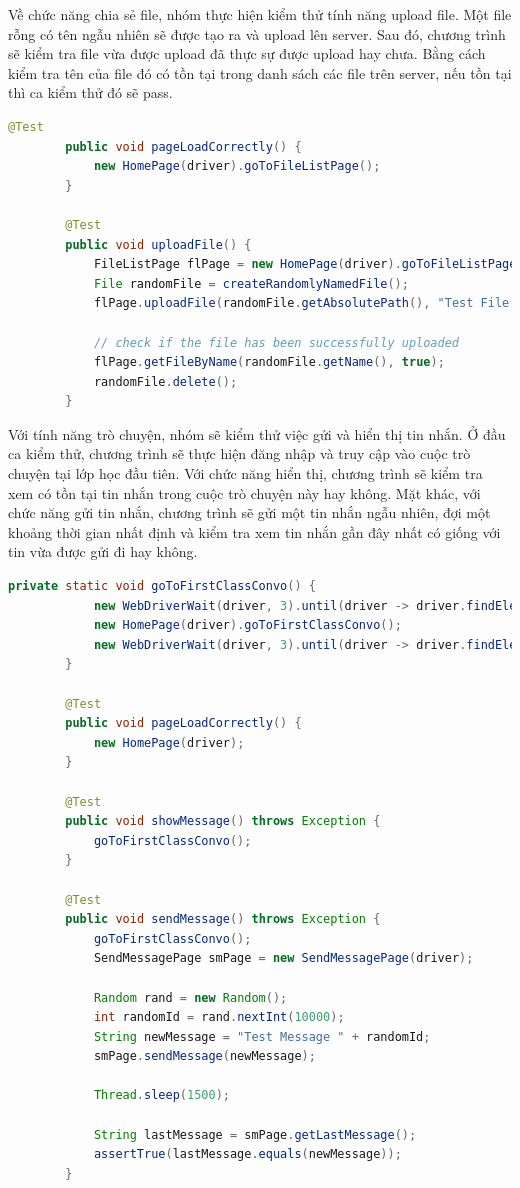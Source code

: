 \documentclass[./../main_file.tex]{subfiles}
\begin{document}
	Về chức năng chia sẻ file, nhóm thực hiện kiểm thử tính năng upload file. Một file rỗng có tên ngẫu nhiên sẽ được tạo ra và upload lên server. Sau đó, chương trình sẽ kiểm tra file vừa được upload đã thực sự được upload hay chưa. Bằng cách kiểm tra tên của file đó có tồn tại trong danh sách các file trên server, nếu tồn tại thì ca kiểm thử đó sẽ pass.
	
	\begin{lstlisting}[language=Java,caption=Ca kiểm thử gửi file]
		@Test
		public void pageLoadCorrectly() {
			new HomePage(driver).goToFileListPage();
		}
		
		@Test
		public void uploadFile() {
			FileListPage flPage = new HomePage(driver).goToFileListPage();
			File randomFile = createRandomlyNamedFile();
			flPage.uploadFile(randomFile.getAbsolutePath(), "Test File For You And Me");
			
			// check if the file has been successfully uploaded
			flPage.getFileByName(randomFile.getName(), true);
			randomFile.delete();
		}
	\end{lstlisting}
	
	Với tính năng trò chuyện, nhóm sẽ kiểm thử việc gửi và hiển thị tin nhắn. Ở đầu ca kiểm thử, chương trình sẽ thực hiện đăng nhập và truy cập vào cuộc trò chuyện tại lớp học đầu tiên. Với chức năng hiển thị, chương trình sẽ kiểm tra xem có tồn tại tin nhắn trong cuộc trò chuyện này hay không. Mặt khác, với chức năng gửi tin nhắn, chương trình sẽ gửi một tin nhắn ngẫu nhiên, đợi một khoảng thời gian nhất định và kiểm tra xem tin nhắn gần đây nhất có giống với tin vừa được gửi đi hay không.
	
	\begin{lstlisting}[language=Java,caption=Ca kiểm thử gửi tin nhắn]
		private static void goToFirstClassConvo() {
			new WebDriverWait(driver, 3).until(driver -> driver.findElement(By.className("itemClass")));
			new HomePage(driver).goToFirstClassConvo();
			new WebDriverWait(driver, 3).until(driver -> driver.findElement(By.className("itemMessage")));
		}
		
		@Test
		public void pageLoadCorrectly() {
			new HomePage(driver);
		}
		
		@Test
		public void showMessage() throws Exception {
			goToFirstClassConvo();
		}
		
		@Test
		public void sendMessage() throws Exception {
			goToFirstClassConvo();
			SendMessagePage smPage = new SendMessagePage(driver);
			
			Random rand = new Random();
			int randomId = rand.nextInt(10000);
			String newMessage = "Test Message " + randomId;
			smPage.sendMessage(newMessage);
			
			Thread.sleep(1500);
			
			String lastMessage = smPage.getLastMessage();
			assertTrue(lastMessage.equals(newMessage));
		}
	\end{lstlisting}
\end{document}
